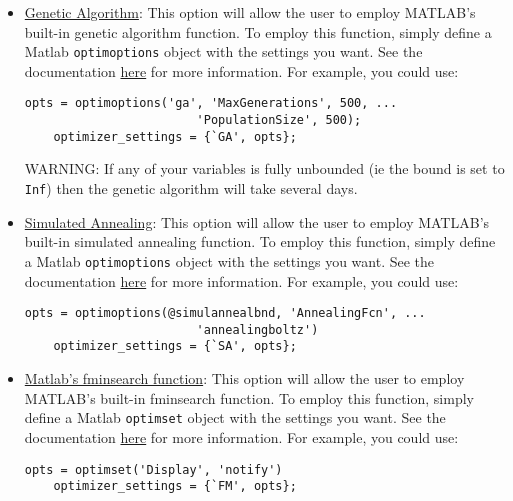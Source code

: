 \documentclass[12pt]{article}
\begin{document}
\begin{itemize}
    \item \underline{Genetic Algorithm}: This option will allow the user to employ MATLAB's built-in genetic algorithm function. To employ this function, simply define a Matlab \lstinline{optimoptions} object with the settings you want. See the documentation \href{https://www.mathworks.com/help/gads/ga.html}{here} for more information. For example, you could use:

    \begin{lstlisting}[backgroundcolor = \color{codeyellow}]
    opts = optimoptions('ga', 'MaxGenerations', 500, ...
                        'PopulationSize', 500);
    optimizer_settings = {`GA', opts};
    \end{lstlisting}

    WARNING: If any of your variables is fully unbounded (ie the bound is set to \lstinline{Inf}) then the genetic algorithm will take several days.

    \item \underline{Simulated Annealing}: This option will allow the user to employ MATLAB's built-in simulated annealing function. To employ this function, simply define a Matlab \lstinline{optimoptions} object with the settings you want. See the documentation \href{https://www.mathworks.com/help/gads/simulannealbnd.html}{here} for more information. For example, you could use:

    \begin{lstlisting}[backgroundcolor = \color{codeyellow}]
    opts = optimoptions(@simulannealbnd, 'AnnealingFcn', ...
                        'annealingboltz')
    optimizer_settings = {`SA', opts};
    \end{lstlisting}

    \item \underline{Matlab's fminsearch function}: This option will allow the user to employ MATLAB's built-in fminsearch function. To employ this function, simply define a Matlab \lstinline{optimset} object with the settings you want. See the documentation \href{https://www.mathworks.com/help/matlab/ref/fminsearch.html}{here} for more information. For example, you could use:

    \begin{lstlisting}[backgroundcolor = \color{codeyellow}]
    opts = optimset('Display', 'notify')
    optimizer_settings = {`FM', opts};
    \end{lstlisting}

\end{itemize}
\end{document}

